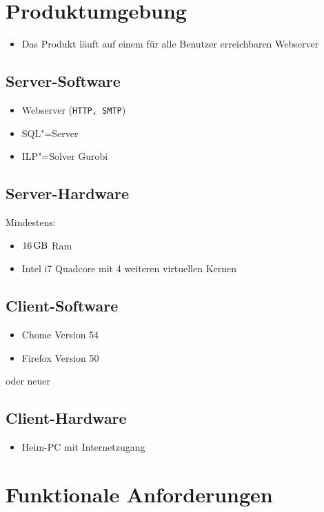 \documentclass[parskip=full]{scrartcl}
\begin{document}
\section{Produktumgebung}

\begin{itemize} 
  \item Das Produkt läuft auf einem für alle Benutzer erreichbaren Webserver
\end{itemize}
\subsection{Server-Software}
\begin{itemize} 
  \item Webserver (\texttt{HTTP, SMTP})
  \item SQL"=Server
  \item ILP"=Solver Gurobi %
\end{itemize}
\subsection{Server-Hardware}
Mindestens:
\begin{itemize} 
  \item $\SI{16}{\giga\byte}$ Ram
  \item Intel i7 Quadcore mit 4 weiteren virtuellen Kernen 
\end{itemize}

\subsection{Client-Software}
\begin{itemize}
  \item Chome Version 54
  \item Firefox Version 50
\end{itemize}
oder neuer
\subsection{Client-Hardware}
\begin{itemize}
  \item Heim-PC mit Internetzugang %
\end{itemize}
\section{Funktionale Anforderungen}
\end{document}
